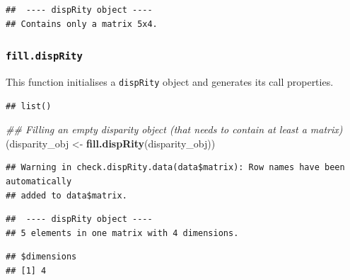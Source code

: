 \documentclass[]{book}
\newenvironment{Shaded}{\begin{snugshade}}{\end{snugshade}}
\newcommand{\CommentTok}[1]{\textcolor[rgb]{0.56,0.35,0.01}{\textit{#1}}}
\newcommand{\KeywordTok}[1]{\textcolor[rgb]{0.13,0.29,0.53}{\textbf{#1}}}
\newcommand{\NormalTok}[1]{#1}
\newcommand{\OperatorTok}[1]{\textcolor[rgb]{0.81,0.36,0.00}{\textbf{#1}}}
\newcommand{\StringTok}[1]{\textcolor[rgb]{0.31,0.60,0.02}{#1}}
\begin{document}
\begin{verbatim}
##  ---- dispRity object ---- 
## Contains only a matrix 5x4.
\end{verbatim}

\hypertarget{fill.disprity}{%
\subsubsection{\texorpdfstring{\texttt{fill.dispRity}}{fill.dispRity}}\label{fill.disprity}}

This function initialises a \texttt{dispRity} object and generates its call properties.

\begin{Shaded}
\end{Shaded}

\begin{verbatim}
## list()
\end{verbatim}

\begin{Shaded}
\begin{Highlighting}[]
\CommentTok{## Filling an empty disparity object (that needs to contain at least a matrix)}
\NormalTok{(disparity_obj <-}\StringTok{ }\KeywordTok{fill.dispRity}\NormalTok{(disparity_obj))}
\end{Highlighting}
\end{Shaded}

\begin{verbatim}
## Warning in check.dispRity.data(data$matrix): Row names have been automatically
## added to data$matrix.
\end{verbatim}

\begin{verbatim}
##  ---- dispRity object ---- 
## 5 elements in one matrix with 4 dimensions.
\end{verbatim}

\begin{Shaded}
\end{Shaded}

\begin{verbatim}
## $dimensions
## [1] 4
\end{verbatim}
\end{document}
